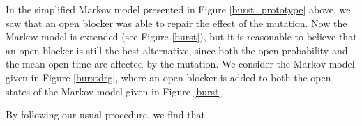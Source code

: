  In the simplified Markov model presented in Figure \ref{burst_prototype} above, we saw
that an open blocker was able to repair the effect of the mutation.
Now the Markov model is extended (see Figure \ref{burst}), but it is reasonable to
believe that an open blocker is still the best alternative, since both the open
probability and the mean open time are affected by the mutation. We consider
the Markov model given in Figure \ref{burstdrg}, where an open blocker is added to both
the open states of the Markov model given in Figure \ref{burst}. 
\begin{comment}
The equilibrium state
of the Markov model given in Figure \ref{burstdrg} is characterized by
\begin{equation}
\begin{array}
[c]{ccc}
k_{ci}c_{0}=k_{ic}i, & k_{oi}o=k_{io}i, & k_{co}c_{0}=k_{oc}o,\\
3\beta c_{0}=\alpha c_{1}, & 2\alpha c_{2}=2\beta c_{1}, & 3\alpha c_{3}=\beta
c_{2},\\
k^{u}o^{\ast}=\mu k^{d}o, & k^{u}c_{0}^{\ast}=\mu k^{d}c_{0}, & k^{u}
c_{1}^{\ast}=\mu k^{d}c_{1},\\
k^{u}c_{2}^{\ast}=\mu k^{d}c_{2}, & k^{u}c_{3}^{\ast}=\mu k^{d}c_{3}, & \\
k_{ob}o=k_{bo}b, & k_{ob}o^{\ast}=k_{bo}b^{\ast}. &
\end{array}
\end{equation}
\end{comment}
By following our usual procedure, we find that
\begin{comment}
\begin{align*}
i &  =\frac{k_{oi}}{k_{io}}o,\text{ }c_{0}=\frac{k_{oc}}{k_{co}}o,\text{ }\\
c_{1} &  =\frac{3\beta}{\alpha}\frac{k_{oc}}{k_{co}}o,\text{ }c_{2}
=\frac{3\beta^{2}}{\alpha^{2}}\frac{k_{oc}}{k_{co}}o,\text{ }c_{3}=\frac
{\beta^{3}}{\alpha^{3}}\frac{k_{oc}}{k_{co}}o,\\
o^{\ast} &  =\mu\frac{k^{d}}{k^{u}}o,c_{0}^{\ast}=\mu\frac{k^{d}}{k^{u}}
\frac{k_{oc}}{k_{co}}o,c_{1}^{\ast}=\mu\frac{3\beta}{\alpha}\frac{k^{d}}
{k^{u}}\frac{k_{oc}}{k_{co}}o,\\
c_{2}^{\ast} &  =\mu\frac{3\beta^{2}}{\alpha^{2}}\frac{k^{d}}{k^{u}}
\frac{k_{oc}}{k_{co}}o,c_{3}^{\ast}=\mu\frac{\beta^{3}}{\alpha^{3}}\frac
{k^{d}}{k^{u}}\frac{k_{oc}}{k_{co}}o,\\
b &  =\frac{k_{ob}}{k_{bo}}o,b^{\ast}=\mu\frac{k_{ob}}{k_{bo}}\frac{k^{d}
}{k^{u}}o,
\end{align*}
\newline and, since the sum of the probabilities equals one, we have
\end{comment}
